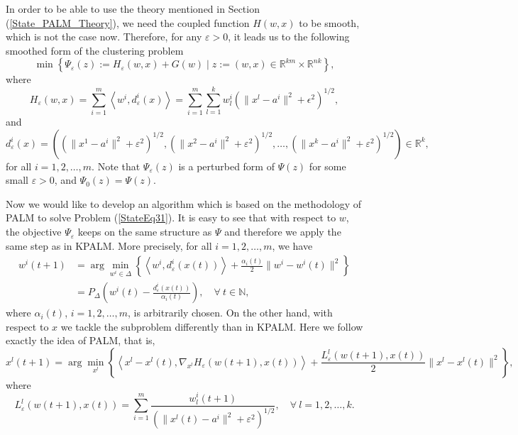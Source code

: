 \documentclass[11pt]{article}
\numberwithin{equation}{section}
\begin{document}
In order to be able to use the theory mentioned in Section (\ref{State_PALM_Theory}), we need the coupled function $H(w,x)$ to be smooth, which is not the case now. Therefore, for any $\varepsilon > 0$, it leads us to the following smoothed form of the clustering problem
\begin{equation}
	\min \left\lbrace \Psi_{\varepsilon}(z) := H_{\varepsilon}(w,x) + G(w) \mid z := (w,x) \in \mathbb{R}^{km} \times \mathbb{R}^{nk} \right\rbrace , \label{StateEq31}
\end{equation}
where 
\begin{equation*}
	H_{\varepsilon}(w,x) = \sum\limits_{i=1}^{m} \left\langle w^i , d_{\varepsilon}^i(x) \right\rangle
	= \sum\limits_{i=1}^{m} \sum\limits_{l=1}^{k} w^i_l \left( \| x^l - a^i \|^2 + {\epsilon}^2 \right)^{1/2} ,
\end{equation*}
and
\begin{equation*}
	d_{\varepsilon}^i(x) = \left( \left( \|x^1 - a^i\|^2 + {\varepsilon}^2 \right)^{1/2}, \left( \|x^2 - a^i\|^2 + {\varepsilon}^2 \right)^{1/2}, \ldots , \left( \|x^k - a^i\|^2 + {\varepsilon}^2 \right)^{1/2} \right) \in \mathbb{R}^k,
\end{equation*}
for all $i=1,2, \ldots, m$.
Note that $\Psi_{\varepsilon}(z)$ is a perturbed form of $\Psi(z)$ for some small $\varepsilon > 0$, and $\Psi_0(z)=\Psi(z)$.

Now we would like to develop an algorithm which is based on the methodology of PALM to solve Problem (\ref{StateEq31}). It is easy to see that with respect to $w$, the objective $\Psi_{\varepsilon}$ keeps on the same structure as $\Psi$ and therefore we apply the same step as in KPALM. More precisely, for all $i=1,2, \ldots, m$, we have
\begin{equation*}
\begin{aligned}
	w^i(t+1) &= \arg\!\min\limits_{w^i \in \Delta} \left\lbrace \left\langle w^i, d^i_{\varepsilon}(x(t)) \right\rangle + \frac{\alpha_i(t)}{2} \|w^i -w^i(t)\|^2 \right\rbrace \\
	&= P_{\Delta} \left( w^i(t) - \frac{d^i_{\varepsilon}(x(t))}{\alpha_i(t)} \right), \quad \forall \: t \in \mathbb{N},
\end{aligned}
\end{equation*}
where $\alpha_i(t)$, $i=1,2, \ldots, m$, is arbitrarily chosen. On the other hand, with respect to $x$ we tackle the subproblem differently than in KPALM. Here we follow exactly the idea of PALM, that is, 
\begin{equation*}
	x^l(t+1) = \arg\!\min\limits_{x^l} \left\lbrace \left\langle x^l - x^l(t) , \nabla_{x^l}H_{\varepsilon}(w(t+1),x(t)) \right\rangle + \frac{L^l_{\varepsilon}(w(t+1),x(t))}{2} \|x^l - x^l(t)\|^2 \right\rbrace,
\end{equation*}
where 
\begin{equation*}
	L^l_{\varepsilon}(w(t+1),x(t)) = \sum\limits_{i=1}^{m} \frac{w^i_l(t+1)}{\left( \|x^l(t)-a^i\|^2 + {\varepsilon}^2 \right)^{1/2}}, \quad \forall \: l=1,2, \ldots, k.
\end{equation*}
\end{document}

